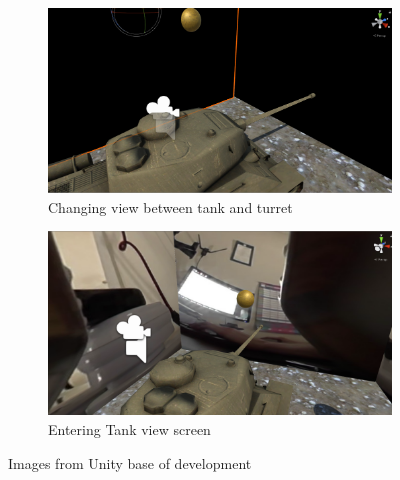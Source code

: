 	\begin{figure}[H]
		\centering
		\begin{subfigure}[b]{0.4\textwidth}
			\includegraphics[width=\linewidth]{project/images/scene1.PNG}
			\caption{Changing view between tank and turret}
			\label{fig:oldScene1}
		\end{subfigure}
		\begin{subfigure}[b]{0.4\textwidth}
			\includegraphics[width=\linewidth]{project/images/scene2.PNG}
			\caption{Entering Tank view screen}
			\label{fig:oldSscene2}
		\end{subfigure}
		\caption{Images from Unity base of development}\label{fig:scene-developemt}
	\end{figure}
